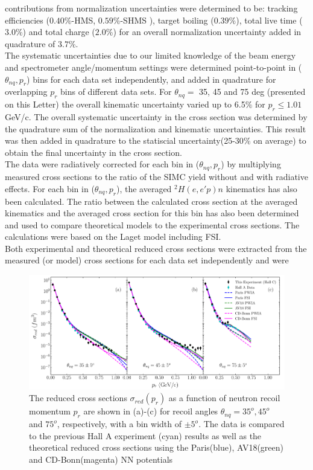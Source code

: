 contributions from normalization uncertainties were determined to be: tracking efficiencies ($0.40 \%$-HMS, $0.59 \%$-SHMS ), target boiling ($0.39 \%$), total live time ($3.0 \%$) and total charge ($2.0\%$)
for an overall normalization uncertainty added in quadrature of $3.7 \%$. \\
\indent The systematic uncertainties due to our limited knowledge of the beam energy and spectrometer angle/momentum settings were determined point-to-point in ($\theta_{nq}, p_{r}$) bins for each data set independently, and added in quadrature for overlapping $p_{r}$ bins
of different data sets. For $\theta_{nq}=$ 35, 45 and 75 deg (presented on this Letter) the overall kinematic uncertainty varied up to 6.5$\%$ for $p_{r}\leq1.01$ GeV/c.
The overall systematic uncertainty in the cross section was determined by the quadrature sum of the normalization and kinematic uncertainties. This result was then added in quadrature
to the statiscial uncertainty(25-30$\%$ on average) to obtain the final uncertainty in the cross section. \\
\indent The data were radiatively corrected for each bin in ($\theta_{nq}, p_{r}$) by multiplying measured cross sections to the ratio of the SIMC yield without and with radiative effects.
For each bin in ($\theta_{nq}, p_{r}$), the averaged $^{2}H(e,e'p)n$ kinematics has also been calculated. The ratio between the calculated cross section at the averaged kinematics and the averaged
cross section for this bin has also been determined and used to compare theoretical models to the experimental cross sections. The calculations were based on the Laget model including FSI\cite{LAGET2005, PhysRevC.21.861}.\\
\indent Both experimental and theoretical reduced cross sections were extracted from the measured (or model) cross sections for each data set independently and were 
\onecolumngrid
\begin{center}
\begin{figure}[hb!]
\includegraphics[scale=0.45]{../prl_plots/PRL_plot1.pdf}
\caption{The reduced cross sections $\sigma_{red}(p_{r})$ as a function of neutron recoil momentum $p_{r}$ are shown in (a)-(c) for recoil angles $\theta_{nq}=35^{o}, 45^{o}$ and $75^{o}$, respectively,
with a bin width of $\pm 5^{o}$. The data is compared to the previous Hall A experiment (cyan) results\cite{PhysRevLett.107.262501} as well as the theoretical reduced cross sections using the Paris(blue),
AV18(green) and CD-Bonn(magenta) NN potentials}
\label{fig:fig1}
\end{figure}
\end{center}
